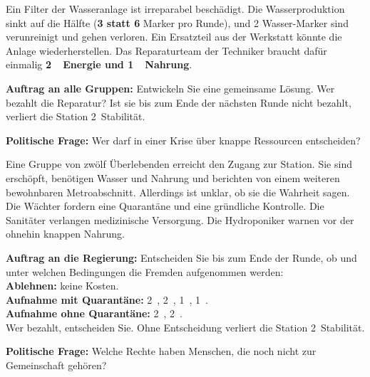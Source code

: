 \clearpage
{}

\small{}
\begin{eventbox}[title={Ereignis 1: Der letzte Filter \hfill \normalfont Zeitpunkt: Ende von Runde 1},fonttitle=\bfseries]
Ein Filter der Wasseranlage ist irreparabel beschädigt. Die Wasserproduktion sinkt auf die Hälfte (\textbf{3 statt 6} Marker pro Runde), und 2 Wasser-Marker sind verunreinigt und gehen verloren. Ein Ersatzteil aus der Werkstatt könnte die Anlage wiederherstellen. Das Reparaturteam der Techniker braucht dafür einmalig \textbf{2~\rE\ Energie und 1~\rN\ Nahrung}.\par\smallskip
\textbf{Auftrag an alle Gruppen:} Entwickeln Sie eine gemeinsame Lösung. Wer bezahlt die Reparatur? Ist sie bis zum Ende der nächsten Runde nicht bezahlt, verliert die Station 2~Stabilität.\par\smallskip
\textbf{Politische Frage:} Wer darf in einer Krise über knappe Ressourcen entscheiden?
\end{eventbox}\par\medskip

\ifkurz\else
\begin{eventbox}[title={Ereignis 2: Unbekannte im Tunnel \hfill \normalfont Zeitpunkt: Runde 2, nach der Regierungsbildung},fonttitle=\bfseries]
Eine Gruppe von zwölf Überlebenden erreicht den Zugang zur Station. Sie sind erschöpft, benötigen Wasser und Nahrung und berichten von einem weiteren bewohnbaren Metroabschnitt. Allerdings ist unklar, ob sie die Wahrheit sagen. Die Wächter fordern eine Quarantäne und eine gründliche Kontrolle. Die Sanitäter verlangen medizinische Versorgung. Die Hydroponiker warnen vor der ohnehin knappen Nahrung.\par\smallskip
\textbf{Auftrag an die Regierung:} Entscheiden Sie bis zum Ende der Runde, ob und unter welchen Bedingungen die Fremden aufgenommen werden:\\
\textbf{Ablehnen:} keine Kosten.\\
\textbf{Aufnahme mit Quarantäne:} 2~\rN, 2~\rW, 1~\rM, 1~\rS.\\
\textbf{Aufnahme ohne Quarantäne:} 2~\rN, 2~\rW.\\
Wer bezahlt, entscheiden Sie. Ohne Entscheidung verliert die Station 2~Stabilität.\par\smallskip
\textbf{Politische Frage:} Welche Rechte haben Menschen, die noch nicht zur Gemeinschaft gehören?
\end{eventbox}\par\medskip
\fi

